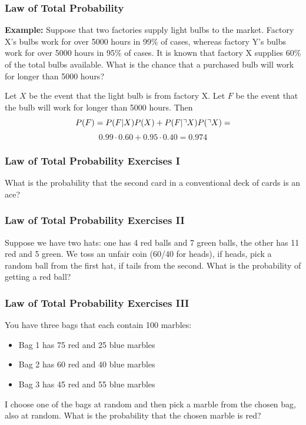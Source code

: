 \documentclass[xcolor=dvipsnames]{beamer}
\begin{document}
\begin{frame}
  \frametitle{Law of Total Probability}
\textbf{Example: }Suppose that two factories supply light bulbs to the
market. Factory X's bulbs work for over 5000 hours in 99\% of cases,
whereas factory Y's bulbs work for over 5000 hours in 95\% of cases.
It is known that factory X supplies 60\% of the total bulbs available.
What is the chance that a purchased bulb will work for longer than
5000 hours?

\bigskip

Let $X$ be the event that the light bulb is from factory X. Let $F$ be
the event that the bulb will work for longer than
5000 hours. Then
\begin{equation}
  \label{eq:uwahiamo}
  P(F)=P(F|X)P(X)+P(F|\urcorner{}X)P(\urcorner{}X)=\notag
\end{equation}
\begin{equation}
  \label{eq:siecafoo}
  0.99\cdot{}0.60+0.95\cdot{}0.40=0.974
\end{equation}
\end{frame}

\begin{frame}
  \frametitle{Law of Total Probability Exercises I}
What is the probability that the second card in a conventional
deck of cards is an ace?
\end{frame}

\begin{frame}
  \frametitle{Law of Total Probability Exercises II}
Suppose we have two hats: one has 4 red balls and 7 green balls,
the other has 11 red and 5 green. We toss an unfair coin (60/40 for
heads), if heads, pick a random ball from the first hat, if tails from
the second. What is the probability of getting a red ball?
\end{frame}

\begin{frame}
  \frametitle{Law of Total Probability Exercises III}
You have three bags that each contain 100 marbles:
\begin{itemize}
\item Bag 1 has 75 red and 25 blue marbles
\item Bag 2 has 60 red and 40 blue marbles
\item Bag 3 has 45 red and 55 blue marbles
\end{itemize}
I choose one of the bags at random and then pick a marble from the
chosen bag, also at random. What is the probability that the chosen
marble is red?
\end{frame}
\end{document}
